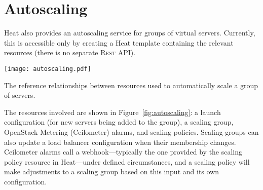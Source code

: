 \section{Autoscaling}

Heat also provides an autoscaling service for groups of virtual servers. Currently, this is accessible only by creating a Heat template containing the relevant resources (there is no separate \textsc{Rest} API).

\begin{marginfigure}
\centering
\texttt{[image: autoscaling.pdf]}
\caption{The reference relationships between resources used to automatically scale a group of servers.}
\label{fig:autoscaling}
\end{marginfigure}

The resources involved are shown in Figure~\ref{fig:autoscaling}: a launch configuration (for new servers being added to the group), a scaling group, OpenStack Metering (Ceilometer) alarms, and scaling policies. Scaling groups can also update a load balancer configuration when their membership changes. Ceilometer alarms call a webhook---typically the one provided by the scaling policy resource in Heat---under defined circumstances, and a scaling policy will make adjustments to a scaling group based on this input and its own configuration.
